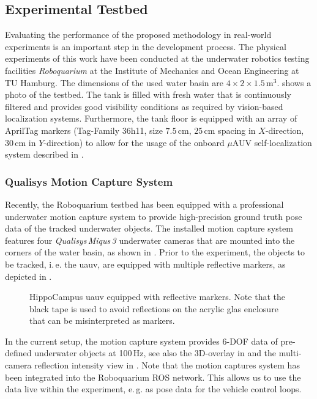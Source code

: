 \subsection{Experimental Testbed}
\label{sec:experimental-testbed}
Evaluating the performance of the proposed methodology in real-world experiments is an important step in the development process.
The physical experiments of this work have been conducted at the underwater robotics testing facilities \textit{Roboquarium} at the Institute of Mechanics and Ocean Engineering at TU Hamburg.
The dimensions of the used water basin are $4\times2\times1.5\,\mathrm{m}^3$.
 shows a photo of the testbed.
The tank is filled with fresh water that is continuously filtered and provides good visibility conditions as required by vision-based localization systems.
Furthermore, the tank floor is equipped with an array of AprilTag markers (Tag-Family 36h11, size $7.5$\,cm, $25$\,cm spacing in $X$-direction, $30$\,cm in $Y$-direction) to allow for the usage of the onboard $\mu$AUV self-localization system described in \cite{Duecker20}.





\subsubsection*{Qualisys Motion Capture System}
Recently, the Roboquarium testbed has been equipped with a professional underwater motion capture system to provide high-precision ground truth pose data of the tracked underwater objects.
The installed motion capture system features four \textit{Qualisys\,Miqus\,3} underwater cameras that are mounted into the corners of the water basin, as shown in .
Prior to the experiment, the objects to be tracked, i.\,e. the \ac{uauv}, are equipped with multiple reflective markers, as depicted in . 
\begin{figure}
    \centering
    
    \caption{HippoCampus \ac{uauv} equipped with reflective markers. Note that the black tape is used to avoid reflections on the acrylic glas enclosure that can be misinterpreted as markers.}
    \label{fig:hippo_with_marker}
\end{figure}
In the current setup, the motion capture system provides 6-DOF data of pre-defined underwater objects at 100\,Hz, see also the 3D-overlay in  and the multi-camera reflection intensity view in .
Note that the motion captures system has been integrated into the Roboquarium ROS network.
This allows us to use the data live within the experiment, e.\,g. as pose data for the vehicle control loops.


